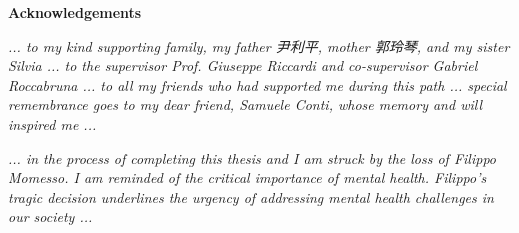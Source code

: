 \thispagestyle{empty}

\begin{center}
  {\bf \Huge Acknowledgements}
\end{center}

\vspace{4cm}


\emph{... to my kind supporting family, my father 尹利平, mother 郭玲琴, and my sister Silvia ... to the supervisor Prof. Giuseppe Riccardi and co-supervisor Gabriel Roccabruna ... to all my friends who had supported me during this path ... special remembrance goes to my dear friend, Samuele Conti, whose memory and will inspired me ... }

\vspace{1em}

\emph{ ... in the process of completing this thesis and I am struck by the loss of Filippo Momesso. I am reminded of the critical importance of mental health. Filippo's tragic decision underlines the urgency of addressing mental health challenges in our society ... }